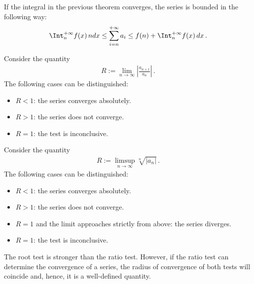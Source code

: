     \begin{property}
        If the integral in the previous theorem converges, the series is bounded in the following way:
        \begin{gather}
            \Int_n^{+\infty} f(x)\,ndx\leq\sum_{i=n}^{+\infty} a_i \leq f(n) + \Int_n^{+\infty} f(x)\,dx\,.
        \end{gather}
    \end{property}

    \begin{method}
        Consider the quantity
        \begin{gather}
            R := \lim_{n\rightarrow\infty}\left|\frac{a_{n+1}}{a_n}\right|\,.
        \end{gather}
        The following cases can be distinguished:
        \begin{itemize}
            \item $R<1$: the series converges absolutely.
            \item $R>1$: the series does not converge.
            \item $R=1$: the test is inconclusive.
        \end{itemize}
    \end{method}

    \begin{method}
        Consider the quantity
        \begin{gather}
            R := \limsup_{n\rightarrow\infty}\sqrt[n]{|a_n|}\,.
        \end{gather}
        The following cases can be distinguished:
        \begin{itemize}
            \item $R<1$: the series converges absolutely.
            \item $R>1$: the series does not converge.
            \item $R=1$ and the limit approaches strictly from above: the series diverges.
            \item $R=1$: the test is inconclusive.
        \end{itemize}
    \end{method}
    \begin{remark}
        The root test is stronger than the ratio test. However, if the ratio test can determine the convergence of a series, the radius of convergence of both tests will coincide and, hence, it is a well-defined quantity.
    \end{remark}

